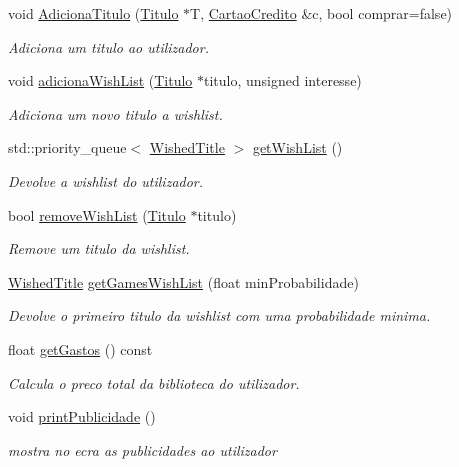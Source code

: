 \begin{DoxyCompactItemize}
void \hyperlink{classUtilizador_ac08a744b9d9d2aca0bd22c60e0beaa83}{Adiciona\+Titulo} (\hyperlink{classTitulo}{Titulo} $\ast$T, \hyperlink{classCartaoCredito}{Cartao\+Credito} \&c, bool comprar=false)
\begin{DoxyCompactList}\small\item\em Adiciona um titulo ao utilizador. \end{DoxyCompactList}\item 
void \hyperlink{classUtilizador_a45ee0a8d988adbd537e2506d80f96cfb}{adiciona\+Wish\+List} (\hyperlink{classTitulo}{Titulo} $\ast$titulo, unsigned interesse)
\begin{DoxyCompactList}\small\item\em Adiciona um novo titulo a wishlist. \end{DoxyCompactList}\item 
std\+::priority\+\_\+queue$<$ \hyperlink{classWishedTitle}{Wished\+Title} $>$ \hyperlink{classUtilizador_a8624e9e45e13e592e68164b0d7b2b7cd}{get\+Wish\+List} ()
\begin{DoxyCompactList}\small\item\em Devolve a wishlist do utilizador. \end{DoxyCompactList}\item 
bool \hyperlink{classUtilizador_aa47c2fe835a73a23664149ccc7fbc10f}{remove\+Wish\+List} (\hyperlink{classTitulo}{Titulo} $\ast$titulo)
\begin{DoxyCompactList}\small\item\em Remove um titulo da wishlist. \end{DoxyCompactList}\item 
\hyperlink{classWishedTitle}{Wished\+Title} \hyperlink{classUtilizador_a9b80c93b8e8f7716e4ab77b2e1b47071}{get\+Games\+Wish\+List} (float min\+Probabilidade)
\begin{DoxyCompactList}\small\item\em Devolve o primeiro titulo da wishlist com uma probabilidade minima. \end{DoxyCompactList}\item 
float \hyperlink{classUtilizador_a2fc6ea78068d43766a6bc344a3059f61}{get\+Gastos} () const
\begin{DoxyCompactList}\small\item\em Calcula o preco total da biblioteca do utilizador. \end{DoxyCompactList}\item 
void \hyperlink{classUtilizador_a4f3016ff86d68d548f801aa569b854dc}{print\+Publicidade} ()
\begin{DoxyCompactList}\small\item\em mostra no ecra as publicidades ao utilizador \end{DoxyCompactList}\item 

\end{DoxyCompactItemize}
